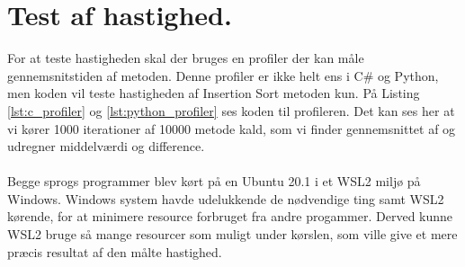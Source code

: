 \documentclass[class=report, crop=false]{standalone}
\begin{document}
    \section{Test af hastighed.}
    For at teste hastigheden skal der bruges en profiler der kan måle gennemsnitstiden af metoden. Denne profiler er ikke helt ens i C\# og Python, men koden vil teste hastigheden af Insertion Sort metoden kun. På Listing \ref{lst:c_profiler} og \ref{lst:python_profiler} ses koden til profileren. Det kan ses her at vi kører 1000 iterationer af 10000 metode kald, som vi finder gennemsnittet af og udregner middelværdi og difference.
    \\\\
    Begge sprogs programmer blev kørt på en Ubuntu 20.1 i et WSL2 miljø på Windows. Windows system havde udelukkende de nødvendige ting samt WSL2 kørende, for at minimere resource forbruget fra andre progammer. Derved kunne WSL2 bruge så mange resourcer som muligt under kørslen, som ville give et mere præcis resultat af den målte hastighed.
    \begin{tcolorbox}
        \lstset{style=codestyle}
        C}, lastline=22, caption={C\# Profiler}, label={lst:c_profiler}]{Kode/Profiler.cs}
    \end{tcolorbox}
    \begin{tcolorbox}
        \lstset{style=codestyle}
        
    \end{tcolorbox}
\end{document}
